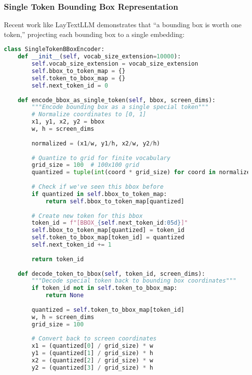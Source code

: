 \subsubsection{Single Token Bounding Box Representation}

Recent work like LayTextLLM demonstrates that ``a bounding box is worth one token,'' projecting each bounding box to a single embedding:

\begin{lstlisting}[language=Python, caption=Single token bounding box encoding]
class SingleTokenBBoxEncoder:
    def __init__(self, vocab_size_extension=10000):
        self.vocab_size_extension = vocab_size_extension
        self.bbox_to_token_map = {}
        self.token_to_bbox_map = {}
        self.next_token_id = 0
        
    def encode_bbox_as_single_token(self, bbox, screen_dims):
        """Encode bounding box as a single special token"""
        # Normalize coordinates to [0, 1]
        x1, y1, x2, y2 = bbox
        w, h = screen_dims
        
        normalized = (x1/w, y1/h, x2/w, y2/h)
        
        # Quantize to grid for finite vocabulary
        grid_size = 100  # 100x100 grid
        quantized = tuple(int(coord * grid_size) for coord in normalized)
        
        # Check if we've seen this bbox before
        if quantized in self.bbox_to_token_map:
            return self.bbox_to_token_map[quantized]
        
        # Create new token for this bbox
        token_id = f"[BBOX_{self.next_token_id:05d}]"
        self.bbox_to_token_map[quantized] = token_id
        self.token_to_bbox_map[token_id] = quantized
        self.next_token_id += 1
        
        return token_id
    
    def decode_token_to_bbox(self, token_id, screen_dims):
        """Decode special token back to bounding box coordinates"""
        if token_id not in self.token_to_bbox_map:
            return None
        
        quantized = self.token_to_bbox_map[token_id]
        w, h = screen_dims
        grid_size = 100
        
        # Convert back to screen coordinates
        x1 = (quantized[0] / grid_size) * w
        y1 = (quantized[1] / grid_size) * h
        x2 = (quantized[2] / grid_size) * w
        y2 = (quantized[3] / grid_size) * h
        

\end{lstlisting}
